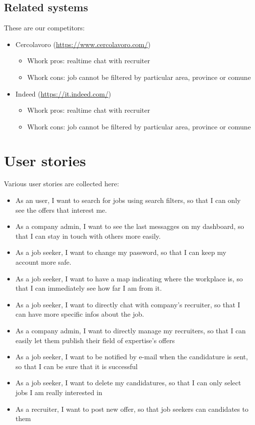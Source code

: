 \documentclass[12pt, a4paper]{article}
\begin{document}
\subsection{Related systems}
These are our competitors:
\begin{itemize}
	\item Cercolavoro (\url{https://www.cercolavoro.com/})
	\begin{itemize}
		\item Whork pros: realtime chat with recruiter
		\item Whork cons: job cannot be filtered by particular area, province or comune
	\end{itemize}
	\item Indeed (\url{https://it.indeed.com/})
	\begin{itemize}
		\item Whork pros: realtime chat with recruiter
		\item Whork cons: job cannot be filtered by particular area, province or comune
	\end{itemize}
\end{itemize}

\section{User stories}
Various user stories are collected here:
\begin{itemize}
	\item As an user, I want to search for jobs using search filters,
		so that I can only see the offers that interest me.
	\item As a company admin, I want to see the last messagges on my dashboard, so that I can 
		stay in touch with others more easily.      
	\item As a job seeker, I want to change my password, so that I can keep my account more safe.                   
	\item As a job seeker, I want to have a map indicating where the workplace is,
		so that I can immediately see how far I am from it.
	\item As a job seeker, I want to directly chat with company's recruiter,
		so that I can have more specific infos about the job.
	\item As a company admin, I want to directly manage my recruiters,
		so that I can easily let them publish their field of expertise's offers
	\item As a job seeker, I want to be notified by e-mail when the candidature is sent, 
		so that I can be sure that it is successful
	\item As a job seeker, I want to delete my candidatures, 
		so that I can only select jobs I am really interested in
	\item As a recruiter, I want to post new offer, so that job seekers can candidates to them
\end{itemize}
\end{document}
